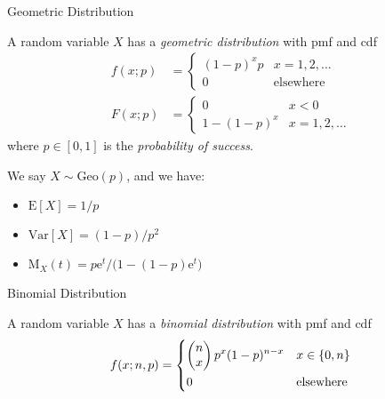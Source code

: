 \documentclass[8pt, handout]{beamer}
\renewcommand{\emph}[1]{\textcolor{defcol}{\textsl{#1}}}
\begin{document}
\begin{frame}{Geometric Distribution}

    A random variable \(X\) has a \emph{geometric distribution} with pmf and cdf
    \begin{align*}
        f(x;p) &= \begin{cases}
            (1 - p)^x p & x = 1, 2, \ldots \\
            0 & \text{elsewhere}
        \end{cases} \\[2em]
        F(x;p) &= \begin{cases}
            0 & x < 0 \\
            1 - (1 - p)^x & x = 1, 2, \ldots
        \end{cases}
    \end{align*}
    where \(p \in [0,1]\) is the \emph{probability of success}.

    \vspace{2em}
    We say \(X \sim \mathrm{Geo}(p)\), and we have:
    \begin{itemize}
        \item \(\mathrm{E}[X] = 1/p\)
        \item \(\mathrm{Var}[X] = (1 - p)/p^2\)
        \item \(\mathrm{M}_X(t) = p \mathrm{e}^t / \Big( 1 - (1 - p)\mathrm{e}^t \Big)\)
    \end{itemize}

\end{frame}

\begin{frame}{Binomial Distribution}

    A random variable \(X\) has a \emph{binomial distribution} with pmf and cdf 
    \begin{align*}
        f(x;n,p) = \begin{dcases}
            \begin{pmatrix}
                n \\ x
            \end{pmatrix} p^x (1 - p)^{n - x} & x \in \{ 0, n \} \\
            0 & \text{elsewhere}
        \end{dcases}
    \end{align*}

\end{frame}
\end{document}
